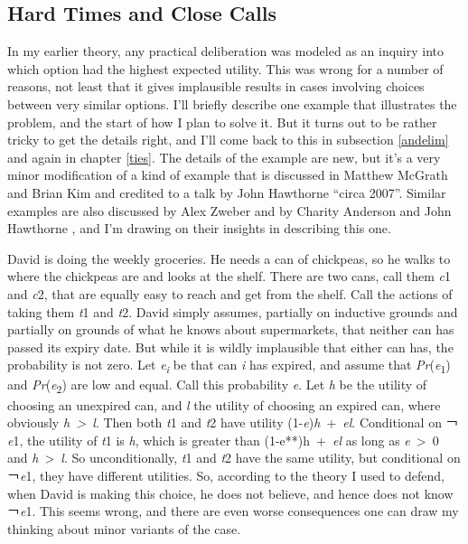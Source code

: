 \documentclass[
  11pt,
]{book}
\begin{document}
\hypertarget{meties}{%
\subsection{Hard Times and Close Calls}\label{meties}}

In my earlier theory, any practical deliberation was modeled as an inquiry into which option had the highest expected utility. This was wrong for a number of reasons, not least that it gives implausible results in cases involving choices between very similar options. I'll briefly describe one example that illustrates the problem, and the start of how I plan to solve it. But it turns out to be rather tricky to get the details right, and I'll come back to this in subsection \ref{andelim} and again in chapter \ref{ties}. The details of the example are new, but it's a very minor modification of a kind of example that is discussed in Matthew McGrath and Brian Kim \citeyearpar{McGrathKim2019} and credited to a talk by John Hawthorne ``circa 2007''. Similar examples are also discussed by Alex Zweber \citeyearpar{Zweber2016} and by Charity Anderson and John Hawthorne \citeyearpar{AndersonHawthorne2019b}, and I'm drawing on their insights in describing this one.

David is doing the weekly groceries. He needs a can of chickpeas, so he walks to where the chickpeas are and looks at the shelf. There are two cans, call them \emph{c}1 and \emph{c}2, that are equally easy to reach and get from the shelf. Call the actions of taking them \emph{t}1 and \emph{t}2. David simply assumes, partially on inductive grounds and partially on grounds of what he knows about supermarkets, that neither can has passed its expiry date. But while it is wildly implausible that either can has, the probability is not zero. Let \emph{e\textsubscript{i}} be that can \emph{i} has expired, and assume that \emph{Pr}(\emph{e}\textsubscript{1}) and \emph{Pr}(\emph{e}\textsubscript{2}) are low and equal. Call this probability \emph{e}. Let \emph{h} be the utility of choosing an unexpired can, and \emph{l} the utility of choosing an expired can, where obviously \emph{h~\textgreater~l}. Then both \emph{t}1 and \emph{t}2 have utility (1-\emph{e})\emph{h}~+~\emph{el}. Conditional on ￢\emph{e}1, the utility of \emph{t}1 is \emph{h}, which is greater than (1-e**)h~+~\emph{el} as long as \emph{e}~\textgreater~0 and \emph{h}~\textgreater~\emph{l}. So unconditionally, \emph{t}1 and \emph{t}2 have the same utility, but conditional on ￢\emph{e}1, they have different utilities. So, according to the theory I used to defend, when David is making this choice, he does not believe, and hence does not know ￢\emph{e}1. This seems wrong, and there are even worse consequences one can draw my thinking about minor variants of the case.
\end{document}
